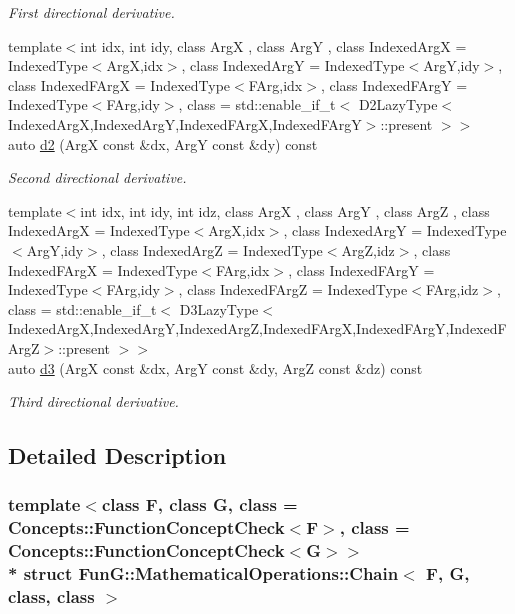 \begin{DoxyCompactItemize}
\begin{DoxyCompactList}\small\item\em First directional derivative. \end{DoxyCompactList}\item 
{\footnotesize template$<$int idx, int idy, class ArgX , class ArgY , class Indexed\+ArgX  = Indexed\+Type$<$\+Arg\+X,idx$>$, class Indexed\+ArgY  = Indexed\+Type$<$\+Arg\+Y,idy$>$, class Indexed\+F\+ArgX  = Indexed\+Type$<$\+F\+Arg,idx$>$, class Indexed\+F\+ArgY  = Indexed\+Type$<$\+F\+Arg,idy$>$, class  = std\+::enable\+\_\+if\+\_\+t$<$ D2\+Lazy\+Type$<$\+Indexed\+Arg\+X,\+Indexed\+Arg\+Y,\+Indexed\+F\+Arg\+X,\+Indexed\+F\+Arg\+Y$>$\+::present $>$$>$ }\\auto \hyperlink{structFunG_1_1MathematicalOperations_1_1Chain_a0ab88c09299ce967583408f7f7dcd2bb}{d2} (ArgX const \&dx, ArgY const \&dy) const 
\begin{DoxyCompactList}\small\item\em Second directional derivative. \end{DoxyCompactList}\item 
{\footnotesize template$<$int idx, int idy, int idz, class ArgX , class ArgY , class ArgZ , class Indexed\+ArgX  = Indexed\+Type$<$\+Arg\+X,idx$>$, class Indexed\+ArgY  = Indexed\+Type$<$\+Arg\+Y,idy$>$, class Indexed\+ArgZ  = Indexed\+Type$<$\+Arg\+Z,idz$>$, class Indexed\+F\+ArgX  = Indexed\+Type$<$\+F\+Arg,idx$>$, class Indexed\+F\+ArgY  = Indexed\+Type$<$\+F\+Arg,idy$>$, class Indexed\+F\+ArgZ  = Indexed\+Type$<$\+F\+Arg,idz$>$, class  = std\+::enable\+\_\+if\+\_\+t$<$ D3\+Lazy\+Type$<$\+Indexed\+Arg\+X,\+Indexed\+Arg\+Y,\+Indexed\+Arg\+Z,\+Indexed\+F\+Arg\+X,\+Indexed\+F\+Arg\+Y,\+Indexed\+F\+Arg\+Z$>$\+::present $>$$>$ }\\auto \hyperlink{structFunG_1_1MathematicalOperations_1_1Chain_a17ac1618545b9d9bd2efa873b36cfbc7}{d3} (ArgX const \&dx, ArgY const \&dy, ArgZ const \&dz) const 
\begin{DoxyCompactList}\small\item\em Third directional derivative. \end{DoxyCompactList}\end{DoxyCompactItemize}


\subsection{Detailed Description}
\subsubsection*{template$<$class F, class G, class = Concepts\+::\+Function\+Concept\+Check$<$\+F$>$, class = Concepts\+::\+Function\+Concept\+Check$<$\+G$>$$>$\\*
struct Fun\+G\+::\+Mathematical\+Operations\+::\+Chain$<$ F, G, class, class $>$}

